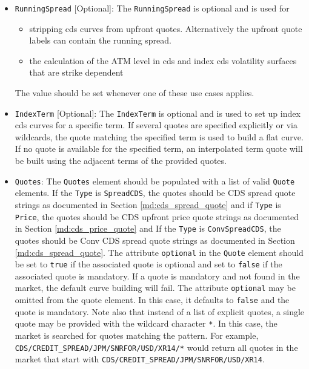 \begin{itemize}
\item \lstinline!RunningSpread! [Optional]:
  The \lstinline!RunningSpread! is optional and is used for
  \begin{itemize}
    \item stripping cds curves from upfront quotes. Alternatively the upfront quote labels can contain the running spread.
    \item the calculation of the ATM level in cds and index cds volatility surfaces that are strike dependent
  \end{itemize}
  The value should be set whenever one of these use cases applies.

\item \lstinline!IndexTerm! [Optional]: The \lstinline!IndexTerm! is optional and is used to set up index cds curves for
  a specific term. If several quotes are specified explicitly or via wildcards, the quote matching the specified term is
  used to build a flat curve. If no quote is available for the specified term, an interpolated term quote will be built
  using the adjacent terms of the provided quotes.

\item \lstinline!Quotes!:
The \lstinline!Quotes! element should be populated with a list of valid \lstinline!Quote! elements. If the \lstinline!Type! is \lstinline!SpreadCDS!, the quotes should be CDS spread quote strings as documented in Section \ref{md:cds_spread_quote} and if \lstinline!Type! is \lstinline!Price!, the quotes should be CDS upfront price quote strings as documented in Section \ref{md:cds_price_quote} and If the \lstinline!Type! is \lstinline!ConvSpreadCDS!, the quotes should be Conv CDS spread quote strings as documented in Section \ref{md:cds_spread_quote}. The attribute \lstinline!optional! in the \lstinline!Quote! element should be set to \lstinline!true! if the associated quote is optional and set to \lstinline!false! if the associated quote is mandatory. If a quote is mandatory and not found in the market, the default curve building will fail. The attribute \lstinline!optional! may be omitted from the quote element. In this case, it defaults to \lstinline!false! and the quote is mandatory. Note also that instead of a list of explicit quotes, a single quote may be provided with the wildcard character \lstinline!*!. In this case, the market is searched for quotes matching the pattern. For example, \lstinline!CDS/CREDIT_SPREAD/JPM/SNRFOR/USD/XR14/*! would return all quotes in the market that start with \lstinline!CDS/CREDIT_SPREAD/JPM/SNRFOR/USD/XR14!.


\end{itemize}
